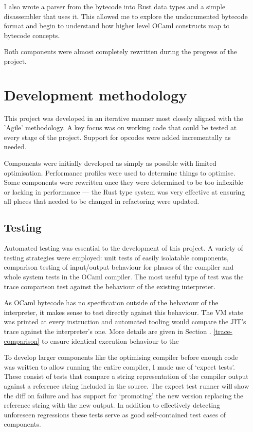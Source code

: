 I also wrote a parser from the bytecode into Rust data types and a simple disassembler that uses
it. This allowed me to explore the undocumented bytecode format and begin to understand how higher
level OCaml constructs map to bytecode concepts.

Both components were almost completely rewritten during the progress of the project.

\section{Development methodology}

This project was developed in an iterative manner most closely aligned with the 'Agile'
methodology.  A key focus was on working code that could be tested at every stage of the project.
Support for opcodes were added incrementally as needed.

Components were initially developed as simply as possible with limited optimisation. Performance
profiles were used to determine things to optimise. Some components were rewritten once they were
determined to be too inflexible or lacking in performance --- the Rust type system was very
effective
at ensuring all places that needed to be changed in refactoring were updated.

\subsection{Testing}

Automated testing was essential to the development of this project. A variety of testing strategies
were
employed: unit tests of easily isolatable components, comparison testing of input/output behaviour
for phases of the compiler and whole system tests in the OCaml compiler. The most useful type of
test
was the trace comparison test against the behaviour of the existing interpreter.

As OCaml bytecode has no specification outside of the behaviour of the interpreter, it makes sense
to test
directly against this behaviour. The VM state was printed at every instruction and automated
tooling would
compare the JIT's trace against the interpreter's one. More details are given in Section
\label{trace-comparison}.  \ref{trace-comparison} to ensure identical execution behaviour to the

To develop larger components like the optimising compiler before enough code was written to allow
running the entire compiler, I made use of `expect tests'. These consist of tests that compare a
string representation of the compiler output against a reference string included in the source. The
expect test runner will show the diff on failure and has support for `promoting' the new version
replacing the reference string with the new output. In addition to effectively detecting unforeseen
regressions these tests serve as good self-contained test cases of components.

